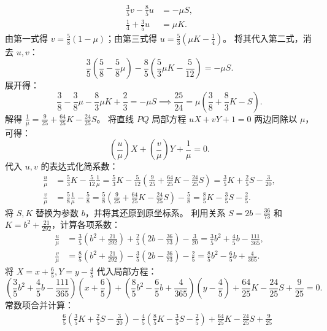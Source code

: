 \begin{solution}
\begin{align*}
\frac{3}{5}v - \frac{8}{5}u &= -\mu S, \\
\frac{1}{4} + \frac{3}{5}u &= \mu K.
\end{align*}
由第一式得 $v = \frac{5}{8}(1 - \mu)$；由第三式得 $u = \frac{5}{3}\left(\mu K - \frac{1}{4}\right)$。
将其代入第二式，消去 $u, v$：
\[ \frac{3}{5}\left(\frac{5}{8} - \frac{5}{8}\mu\right) - \frac{8}{5}\left(\frac{5}{3}\mu K - \frac{5}{12}\right) = -\mu S. \]
展开得：
\[ \frac{3}{8} - \frac{3}{8}\mu - \frac{8}{3}\mu K + \frac{2}{3} = -\mu S \implies \frac{25}{24} = \mu\left(\frac{3}{8} + \frac{8}{3}K - S\right). \]
解得 $\frac{1}{\mu} = \frac{9}{25} + \frac{64}{25}K - \frac{24}{25}S$。
将直线 $PQ$ 局部方程 $uX + vY + 1 = 0$ 两边同除以 $\mu$，可得：
\[ \left(\frac{u}{\mu}\right)X + \left(\frac{v}{\mu}\right)Y + \frac{1}{\mu} = 0. \]
代入 $u, v$ 的表达式化简系数：
\begin{align*}
\frac{u}{\mu} &= \frac{5}{3}K - \frac{5}{12}\frac{1}{\mu} = \frac{5}{3}K - \frac{5}{12}\left(\frac{9}{25} + \frac{64}{25}K - \frac{24}{25}S\right) = \frac{3}{5}K + \frac{2}{5}S - \frac{3}{20}, \\
\frac{v}{\mu} &= \frac{5}{8}\frac{1}{\mu} - \frac{5}{8} = \frac{5}{8}\left(\frac{9}{25} + \frac{64}{25}K - \frac{24}{25}S\right) - \frac{5}{8} = \frac{8}{5}K - \frac{3}{5}S - \frac{2}{5}.
\end{align*}
将 $S, K$ 替换为参数 $b$，并将其还原到原坐标系。
利用关系 $S = 2b - \frac{36}{73}$ 和 $K = b^2 + \frac{21}{292}$，计算各项系数：
\begin{align*}
\frac{u}{\mu} &= \frac{3}{5}\left(b^2 + \frac{21}{292}\right) + \frac{2}{5}\left(2b - \frac{36}{73}\right) - \frac{3}{20} = \frac{3}{5}b^2 + \frac{4}{5}b - \frac{111}{365}, \\
\frac{v}{\mu} &= \frac{8}{5}\left(b^2 + \frac{21}{292}\right) - \frac{3}{5}\left(2b - \frac{36}{73}\right) - \frac{2}{5} = \frac{8}{5}b^2 - \frac{6}{5}b + \frac{4}{365}.
\end{align*}
将 $X = x + \frac{6}{5}, Y = y - \frac{4}{5}$ 代入局部方程：
\[ \left(\frac{3}{5}b^2 + \frac{4}{5}b - \frac{111}{365}\right)\left(x + \frac{6}{5}\right) + \left(\frac{8}{5}b^2 - \frac{6}{5}b + \frac{4}{365}\right)\left(y - \frac{4}{5}\right) + \frac{64}{25}K - \frac{24}{25}S + \frac{9}{25} = 0. \]
常数项合并计算：
\begin{align*}
&\quad \frac{6}{5}\left(\frac{3}{5}K + \frac{2}{5}S - \frac{3}{20}\right) - \frac{4}{5}\left(\frac{8}{5}K - \frac{3}{5}S - \frac{2}{5}\right) + \frac{64}{25}K - \frac{24}{25}S + \frac{9}{25} \\

\end{align*}
\end{solution}
